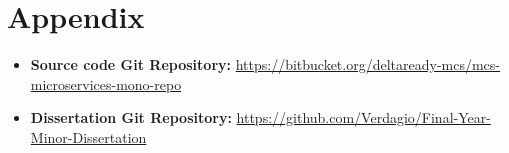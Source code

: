 \chapter{Appendix}
\begin{itemize}
\item \textbf{Source code Git Repository:} \url{https://bitbucket.org/deltaready-mcs/mcs-microservices-mono-repo}
\item \textbf{Dissertation Git Repository:} \url{https://github.com/Verdagio/Final-Year-Minor-Dissertation}
\end{itemize}
